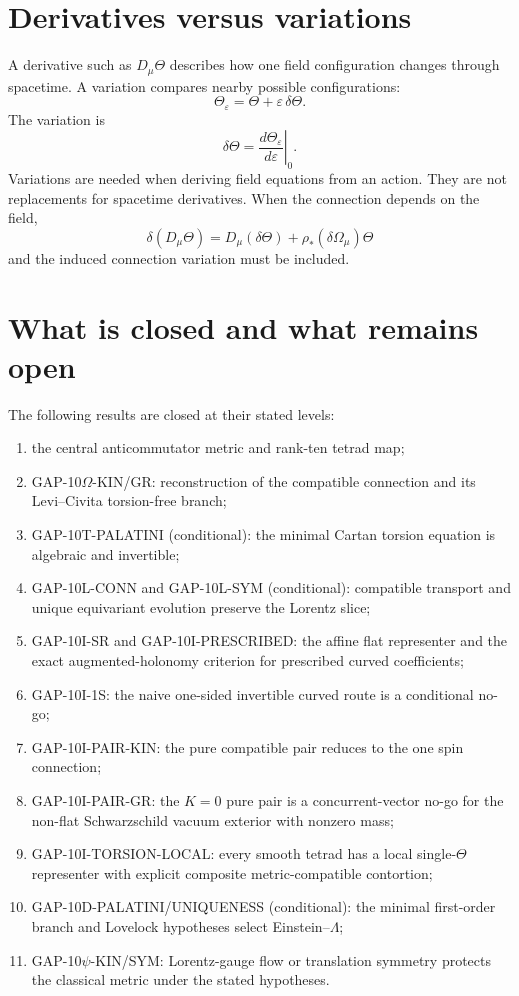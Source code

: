 \section{Derivatives versus variations}
A derivative such as $D_\mu\Theta$ describes how one field configuration changes
through spacetime.  A variation compares nearby possible configurations:
\[
 \Theta_\varepsilon=\Theta+\varepsilon\,\delta\Theta.
\]
The variation is
\[
 \delta\Theta=
 \left.\frac{d\Theta_\varepsilon}{d\varepsilon}\right|_{0}.
\]
Variations are needed when deriving field equations from an action.  They are
not replacements for spacetime derivatives.  When the connection depends on
the field,
\[
 \delta(D_\mu\Theta)
 =D_\mu(\delta\Theta)+\rho_*(\delta\Omega_\mu)\Theta
\]
and the induced connection variation must be included.

\section{What is closed and what remains open}
The following results are closed at their stated levels:
\begin{enumerate}
 \item the central anticommutator metric and rank-ten tetrad map;
 \item GAP-10$\Omega$-KIN/GR: reconstruction of the compatible connection and
       its Levi--Civita torsion-free branch;
 \item GAP-10T-PALATINI (conditional): the minimal Cartan torsion equation is
       algebraic and invertible;
 \item GAP-10L-CONN and GAP-10L-SYM (conditional): compatible transport and
       unique equivariant evolution preserve the Lorentz slice;
 \item GAP-10I-SR and GAP-10I-PRESCRIBED: the affine flat representer and the
       exact augmented-holonomy criterion for prescribed curved coefficients;
 \item GAP-10I-1S: the naive one-sided invertible curved route is a conditional
       no-go;
 \item GAP-10I-PAIR-KIN: the pure compatible pair reduces to the one spin
       connection;
 \item GAP-10I-PAIR-GR: the $K=0$ pure pair is a concurrent-vector no-go
       for the non-flat Schwarzschild vacuum exterior with nonzero mass;
 \item GAP-10I-TORSION-LOCAL: every smooth tetrad has a local single-$\Theta$
       representer with explicit composite metric-compatible contortion;
 \item GAP-10D-PALATINI/UNIQUENESS (conditional): the minimal first-order
       branch and Lovelock hypotheses select Einstein--$\Lambda$;
 \item GAP-10$\psi$-KIN/SYM: Lorentz-gauge flow or translation symmetry
       protects the classical metric under the stated hypotheses.
\end{enumerate}

